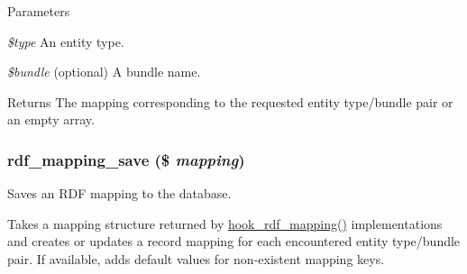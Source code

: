 \begin{DoxyParams}{Parameters}
\item[{\em \$type}]An entity type. \item[{\em \$bundle}](optional) A bundle name.\end{DoxyParams}
\begin{DoxyReturn}{Returns}
The mapping corresponding to the requested entity type/bundle pair or an empty array. 
\end{DoxyReturn}
\hypertarget{group__rdf_ga1e628638b2684b9a5ebc0847066d9131}{
\subsubsection[{rdf\_\-mapping\_\-save}]{\setlength{\rightskip}{0pt plus 5cm}rdf\_\-mapping\_\-save (\$ {\em mapping})}}
\label{group__rdf_ga1e628638b2684b9a5ebc0847066d9131}
Saves an RDF mapping to the database.

Takes a mapping structure returned by \hyperlink{group__rdf_gae3e7f047bdcb9309b323e2af09966765}{hook\_\-rdf\_\-mapping()} implementations and creates or updates a record mapping for each encountered entity type/bundle pair. If available, adds default values for non-\/existent mapping keys.


